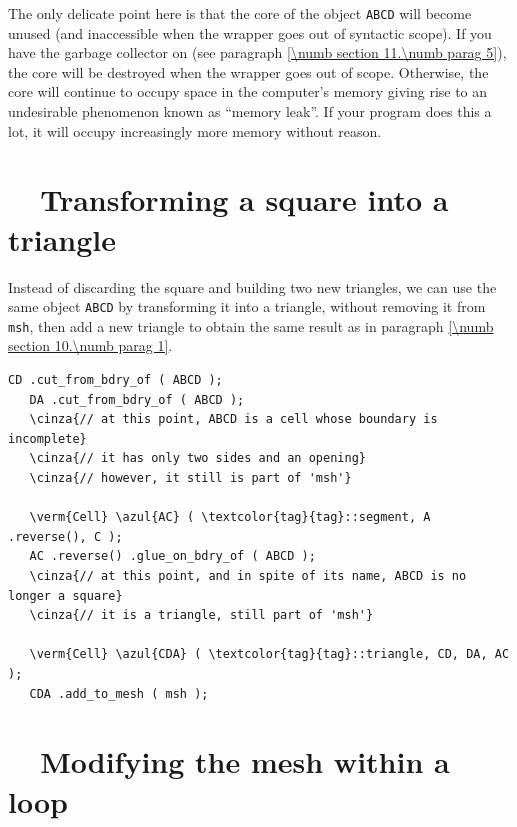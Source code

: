 The only delicate point here is that the core of the {\small\tt{}} object
{\small\tt ABCD}
will become unused (and inaccessible when the wrapper goes out of syntactic scope).
If you have the garbage collector on (see paragraph \ref{\numb section 11.\numb parag 5}),
the core will be destroyed when the wrapper goes out of scope.
Otherwise, the core will continue to occupy space in the computer's memory giving rise
to an undesirable phenomenon known as ``memory leak''.
If your program does this a lot, it will occupy increasingly more memory without reason.


\section{~~{Transforming a square into a triangle}}\label{\numb section 10.\numb parag 2}

Instead of discarding the square and building two new triangles, we can use the same
{\small\tt{}} object {\small\tt ABCD}
by transforming it into a triangle, without removing it from {\small\tt msh}, then add
a new triangle to obtain the same result as in paragraph \ref{\numb section 10.\numb parag 1}.

\begin{Verbatim}[commandchars=\\\{\},formatcom=\small\tt,frame=single,
   label=parag-\ref{\numb section 10.\numb parag 2}.cpp,rulecolor=\color{coment},
   baselinestretch=0.94,framesep=2mm]
   CD .cut_from_bdry_of ( ABCD );
   DA .cut_from_bdry_of ( ABCD );
   \cinza{// at this point, ABCD is a cell whose boundary is incomplete}
   \cinza{// it has only two sides and an opening}
   \cinza{// however, it still is part of 'msh'}

   \verm{Cell} \azul{AC} ( \textcolor{tag}{tag}::segment, A .reverse(), C );
   AC .reverse() .glue_on_bdry_of ( ABCD );
   \cinza{// at this point, and in spite of its name, ABCD is no longer a square}
   \cinza{// it is a triangle, still part of 'msh'}

   \verm{Cell} \azul{CDA} ( \textcolor{tag}{tag}::triangle, CD, DA, AC );
   CDA .add_to_mesh ( msh );
\end{Verbatim}



\section{~~Modifying the mesh within a loop}\label{\numb section 10.\numb parag 3}

